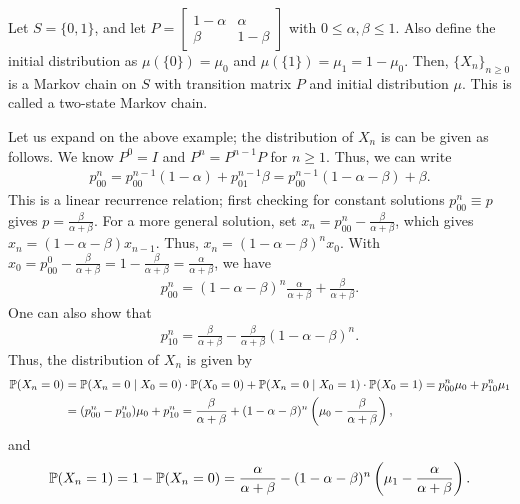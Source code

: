 \begin{example}
    Let $S = \{0,1\}$, and let $P = \begin{bmatrix}
        1-\alpha & \alpha \\
        \beta & 1-\beta
    \end{bmatrix}$ with $0 \leq \alpha,\beta \leq 1$. Also define the initial distribution as $\mu(\{0\}) = \mu_{0}$ and $\mu(\{1\}) = \mu_{1} = 1-\mu_{0}$. Then, $\{X_{n}\}_{n \geq 0}$ is a Markov chain on $S$ with transition matrix $P$ and initial distribution $\mu$. This is called a two-state Markov chain.
\end{example}
Let us expand on the above example; the distribution of $X_{n}$ is can be given as follows. We know $P^{0} = I$ and $P^{n} = P^{n-1}P$ for $n \geq 1$. Thus, we can write
\begin{align}
    p_{00}^{n} = p_{00}^{n-1}(1-\alpha) + p_{01}^{n-1}\beta = p_{00}^{n-1}(1-\alpha-\beta) + \beta.
\end{align}
This is a linear recurrence relation; first checking for constant solutions $p_{00}^{n} \equiv p$ gives $p = \frac{\beta}{\alpha + \beta}$. For a more general solution, set $x_{n} = p_{00}^{n} - \frac{\beta}{\alpha + \beta}$, which gives $x_{n} = (1-\alpha-\beta)x_{n-1}$. Thus, $x_{n} = (1-\alpha-\beta)^{n}x_{0}$. With $x_{0} = p_{00}^{0} - \frac{\beta}{\alpha + \beta} = 1 - \frac{\beta}{\alpha + \beta} = \frac{\alpha}{\alpha + \beta}$, we have
\begin{align}
    p_{00}^{n} = (1-\alpha-\beta)^{n}\frac{\alpha}{\alpha + \beta} + \frac{\beta}{\alpha + \beta}.
\end{align}
One can also show that
\begin{align}
    p_{10}^{n} = \frac{\beta}{\alpha + \beta} - \frac{\beta}{\alpha + \beta}(1-\alpha-\beta)^{n}.
\end{align}
Thus, the distribution of $X_{n}$ is given by
\begin{align}
    \mathbb{P}(X_{n} = 0)
    &= \mathbb{P}(X_{n} = 0 \mid X_{0} = 0) \cdot \mathbb{P}(X_{0} = 0) + \mathbb{P}(X_{n} = 0 \mid X_{0} = 1) \cdot \mathbb{P}(X_{0} = 1) = p_{00}^{n}\mu_{0} + p_{10}^{n}\mu_{1} \notag \\
    &= (p_{00}^{n} - p_{10}^{n})\mu_{0} + p_{10}^{n} = \frac{\beta}{\alpha + \beta} + (1-\alpha-\beta)^{n}\left(\mu_{0} - \frac{\beta}{\alpha + \beta}\right),
\end{align}
and
\begin{align}
    \mathbb{P}(X_{n}=1) = 1-\mathbb{P}(X_{n}=0) = \frac{\alpha}{\alpha + \beta} - (1-\alpha-\beta)^{n}\left(\mu_{1} - \frac{\alpha}{\alpha + \beta}\right).
\end{align}
